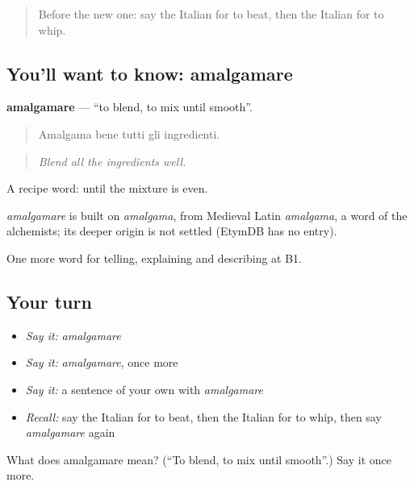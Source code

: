\begin{quote}
Before the new one: say the Italian for to beat, then the Italian for to whip.
\end{quote}

\subsection*{You'll want to know: amalgamare}
\textbf{amalgamare} — \textquotedblleft{}to blend, to mix until smooth\textquotedblright{}.

\begin{quote}
Amalgama bene tutti gli ingredienti.
\end{quote}

\begin{quote}
\emph{Blend all the ingredients well.}
\end{quote}

A recipe word: until the mixture is even.

\begin{cousinweb}
\emph{amalgamare} is built on \emph{amalgama}, from Medieval Latin \emph{amalgama}, a word of the alchemists; its deeper origin is not settled (EtymDB has no entry).
\end{cousinweb}

\begin{grammarlens}[title={What you've built}]
One more word for telling, explaining and describing at B1.
\end{grammarlens}

\subsection*{Your turn}
\begin{itemize}
\raggedright
  \item \emph{Say it:} \emph{amalgamare}
  \item \emph{Say it:} \emph{amalgamare}, once more
  \item \emph{Say it:} a sentence of your own with \emph{amalgamare}
  \item \emph{Recall:} say the Italian for to beat, then the Italian for to whip, then say \emph{amalgamare} again
\end{itemize}

\begin{tcolorbox}[breakable,colback=teal!4,colframe=teal!35!black,title={Before you move on}]
What does amalgamare mean? (\textquotedblleft{}To blend, to mix until smooth\textquotedblright{}.) Say it once more.
\end{tcolorbox}
